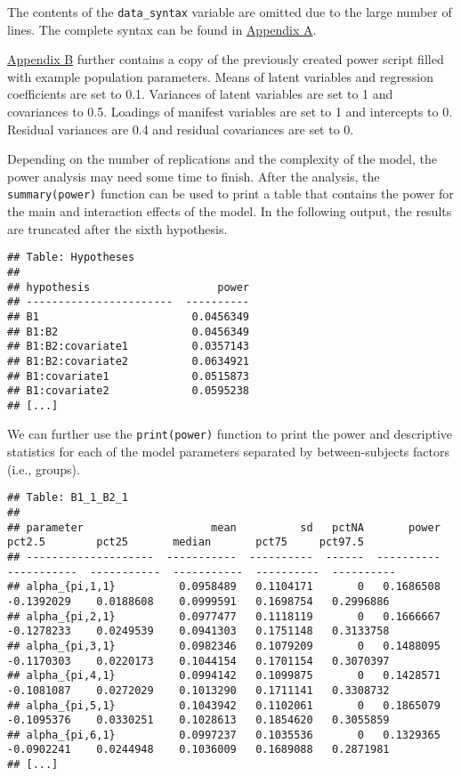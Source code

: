 \documentclass[
]{book}
\begin{document}
The contents of the \texttt{data\_syntax} variable are omitted due to the large number of lines. The complete syntax can be found in \protect\hyperlink{power-script-example}{Appendix A}.

\protect\hyperlink{filled-power-script-example}{Appendix B} further contains a copy of the previously created power script filled with example population parameters. Means of latent variables and regression coefficients are set to 0.1. Variances of latent variables are set to 1 and covariances to 0.5. Loadings of manifest variables are set to 1 and intercepts to 0. Residual variances are 0.4 and residual covariances are set to 0.

Depending on the number of replications and the complexity of the model, the power analysis may need some time to finish. After the analysis, the \texttt{summary(power)} function can be used to print a table that contains the power for the main and interaction effects of the model. In the following output, the results are truncated after the sixth hypothesis.

\begin{verbatim}
## Table: Hypotheses
## 
## hypothesis                    power
## -----------------------  ----------
## B1                        0.0456349
## B1:B2                     0.0456349
## B1:B2:covariate1          0.0357143
## B1:B2:covariate2          0.0634921
## B1:covariate1             0.0515873
## B1:covariate2             0.0595238
## [...]
\end{verbatim}

We can further use the \texttt{print(power)} function to print the power and descriptive statistics for each of the model parameters separated by between-subjects factors (i.e., groups).

\begin{verbatim}
## Table: B1_1_B2_1
## 
## parameter                    mean          sd   pctNA       power       pct2.5        pct25       median       pct75     pct97.5
## --------------------  -----------  ----------  ------  ----------  -----------  -----------  -----------  ----------  ----------
## alpha_{pi,1,1}          0.0958489   0.1104171       0   0.1686508   -0.1392029    0.0188608    0.0999591   0.1698754   0.2996886
## alpha_{pi,2,1}          0.0977477   0.1118119       0   0.1666667   -0.1278233    0.0249539    0.0941303   0.1751148   0.3133758
## alpha_{pi,3,1}          0.0982346   0.1079209       0   0.1488095   -0.1170303    0.0220173    0.1044154   0.1701154   0.3070397
## alpha_{pi,4,1}          0.0994142   0.1099875       0   0.1428571   -0.1081087    0.0272029    0.1013290   0.1711141   0.3308732
## alpha_{pi,5,1}          0.1043942   0.1102061       0   0.1865079   -0.1095376    0.0330251    0.1028613   0.1854620   0.3055859
## alpha_{pi,6,1}          0.0997237   0.1035536       0   0.1329365   -0.0902241    0.0244948    0.1036009   0.1689088   0.2871981
## [...]
\end{verbatim}
\end{document}
